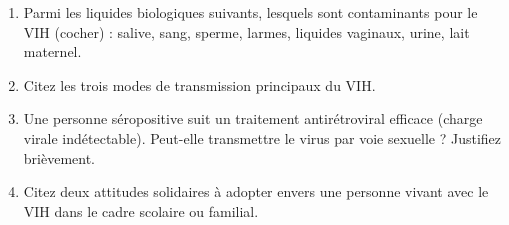 \documentclass[11pt]{article}
\begin{document}
\begin{exercice}
\begin{enumerate}
    \item Parmi les liquides biologiques suivants, lesquels sont contaminants pour le VIH (cocher) : salive, sang, sperme, larmes, liquides vaginaux, urine, lait maternel.
    \item Citez les trois modes de transmission principaux du VIH.
    \item Une personne séropositive suit un traitement antirétroviral efficace (charge virale indétectable). Peut-elle transmettre le virus par voie sexuelle ? Justifiez brièvement.
    \item Citez deux attitudes solidaires à adopter envers une personne vivant avec le VIH dans le cadre scolaire ou familial.
\end{enumerate}
\end{exercice}
\end{document}
